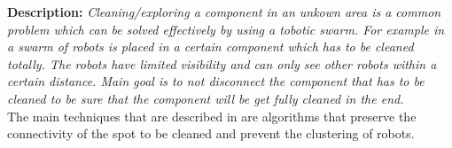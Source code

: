 
\textbf{Description: }
\emph{Cleaning/exploring a component in an unkown area is a common problem which can be solved effectively by using a tobotic swarm. For example in \cite{wagner2008cooperative} a swarm of robots is placed in a certain component which has to be cleaned totally. The robots have limited visibility and can only see other robots within a certain distance. Main goal is to not disconnect the component that has to be cleaned to be sure that the component will be get fully cleaned in the end.} \\
  The main techniques that are described in \cite{wagner2008cooperative} are algorithms that preserve the connectivity of the spot to be cleaned and prevent the clustering of robots.